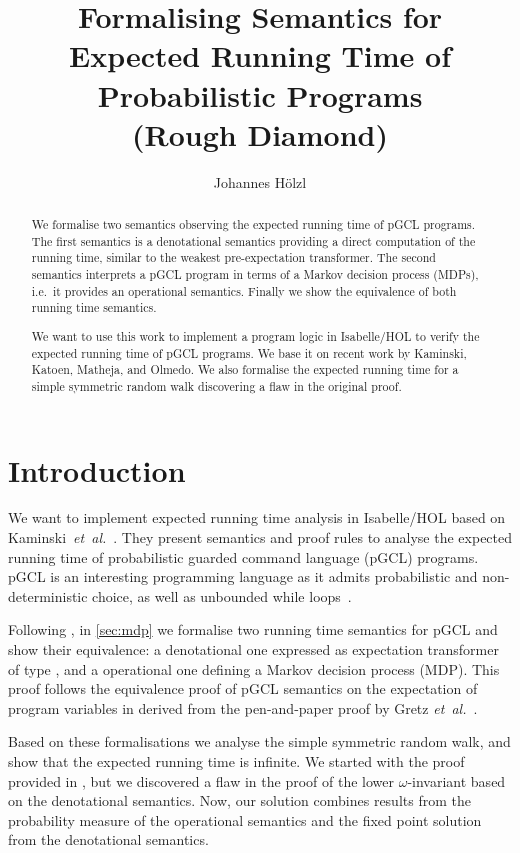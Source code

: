 \documentclass[a4paper]{llncs}
\title{Formalising Semantics for Expected Running Time of Probabilistic Programs \\ (Rough Diamond)}
\author{Johannes Hölzl}
\institute{Fakultät für Informatik, TU München, \email{hoelzl@in.tum.de}}
\newcommand{\etal}{\emph{et~al.}}
\begin{document}
\maketitle

\begin{abstract}

We formalise two semantics observing the expected running time of pGCL programs.
The first semantics is a denotational semantics providing a direct computation of the running time, similar to the weakest pre-expectation transformer.
The second semantics interprets a pGCL program in terms of a Markov decision process (MDPs), i.e.~it provides an operational semantics.
Finally we show the equivalence of both running time semantics.

We want to use this work to implement a program logic in Isabelle/HOL to verify the expected running time of pGCL programs.
We base it on recent work by Kaminski, Katoen, Matheja, and Olmedo.
We also formalise the expected running time for a simple symmetric random walk discovering a flaw in the original proof.

\end{abstract}

\section{Introduction}\label{introduction}

We want to implement expected running time analysis in Isabelle/HOL based on Kaminski~\etal~\cite{kaminski2016ert}.
They present semantics and proof rules to analyse the expected running time of probabilistic guarded command language (pGCL) programs.
pGCL is an interesting programming language as it admits probabilistic and non-deterministic choice, as well as unbounded while loops~\cite{mciver2004arp}.

Following \cite{kaminski2016ert}, in \autoref{sec:mdp} we formalise two running time semantics for pGCL and show their equivalence: a denotational one expressed as expectation transformer of type , and a operational one defining a Markov decision process (MDP).
This proof follows the equivalence proof of pGCL semantics on the expectation of program variables in \cite{hoelzl2016mdp} derived from the pen-and-paper proof by Gretz \etal~\cite{gretz2014pgclsem}.

Based on these formalisations we analyse the simple symmetric random walk, and show that the expected running time is infinite.
We started with the proof provided in \cite{kaminski2016ert}, but we discovered a flaw in the proof of the lower $\omega$-invariant based on the denotational semantics. 
Now, our solution combines results from the probability measure of the operational semantics and the fixed point solution from the denotational semantics.
\end{document}
